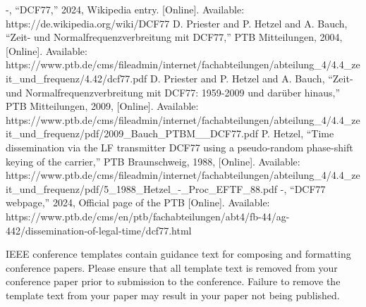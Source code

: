 \documentclass[conference]{IEEEtran}
\begin{document}
\begin{thebibliography}{00}
 -, ``DCF77,'' 2024, Wikipedia entry. [Online]. Available: https://de.wikipedia.org/wiki/DCF77
 D. Priester and P. Hetzel and A. Bauch, ``Zeit- und Normalfrequenzverbreitung mit DCF77,'' PTB Mitteilungen, 2004, [Online]. Available: https://www.ptb.de/cms/fileadmin/internet/fachabteilungen/abteilung\_4/4.4\_zeit\_und\_frequenz/4.42/dcf77.pdf
 D. Priester and P. Hetzel and A. Bauch, ``Zeit- und Normalfrequenzverbreitung mit DCF77: 1959-2009 und darüber hinaus,'' PTB Mitteilungen, 2009, [Online]. Available: https://www.ptb.de/cms/fileadmin/internet/fachabteilungen/abteilung\_4/4.4\_zeit\_und\_frequenz/pdf/2009\_Bauch\_PTBM\_\_DCF77.pdf
 P. Hetzel, ``Time dissemination via the LF transmitter DCF77 using a pseudo-random phase-shift keying of the carrier,'' PTB Braunschweig, 1988, [Online]. Available: https://www.ptb.de/cms/fileadmin/internet/fachabteilungen/abteilung\_4/4.4\_zeit\_und\_frequenz/pdf/5\_1988\_Hetzel\_-\_Proc\_EFTF\_88.pdf
 -, ``DCF77 webpage,'' 2024, Official page of the PTB [Online]. Available: https://www.ptb.de/cms/en/ptb/fachabteilungen/abt4/fb-44/ag-442/dissemination-of-legal-time/dcf77.html
\end{thebibliography}

\vspace{12pt}
\color{red}
IEEE conference templates contain guidance text for composing and formatting conference papers. Please ensure that all template text is removed from your conference paper prior to submission to the conference. Failure to remove the template text from your paper may result in your paper not being published.
\end{document}
